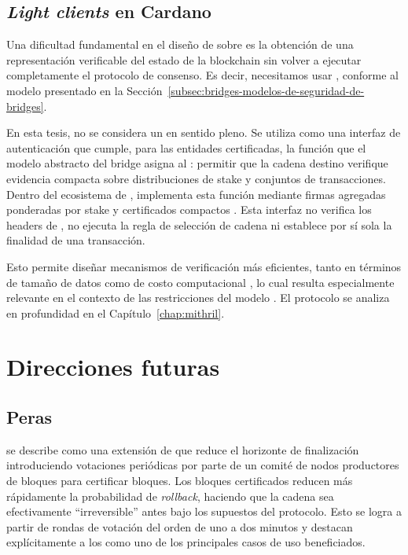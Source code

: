 \subsection{\textit{Light clients} en Cardano}
\label{subsec:motivation-light-clients-en-cardano}

Una dificultad fundamental en el diseño de \Bridges sobre \Cardano es la obtención de una representación verificable del estado de la blockchain sin volver a ejecutar completamente el protocolo de consenso. Es decir, necesitamos usar \LightClients, conforme al modelo presentado en la Sección~\ref{subsec:bridges-modelos-de-seguridad-de-bridges}.

En esta tesis, \Mithril no se considera un \LightClient en sentido pleno. Se utiliza como una interfaz de autenticación que cumple, para las entidades certificadas, la función que el modelo abstracto del bridge asigna al \LightClient: permitir que la cadena destino verifique evidencia compacta sobre distribuciones de stake y conjuntos de transacciones. Dentro del ecosistema de \Cardano, \Mithril implementa esta función mediante firmas agregadas ponderadas por stake y certificados compactos \cite{cryptoeprint:2021/916}. Esta interfaz no verifica los headers de \Praos, no ejecuta la regla de selección de cadena ni establece por sí sola la finalidad de una transacción.

Esto permite diseñar mecanismos de verificación más eficientes, tanto en términos de tamaño de datos como de costo computacional \Onchain, lo cual resulta especialmente relevante en el contexto de las restricciones del modelo \eUTxO. El protocolo \Mithril se analiza en profundidad en el Capítulo~\ref{chap:mithril}.

\section{Direcciones futuras}
\label{sec:motivation-direcciones-futuras}

\subsection{Peras}
\label{subsec:motivation-peras}

\Peras se describe como una extensión de \Praos que reduce el horizonte de finalización introduciendo votaciones periódicas por parte de un comité de nodos productores de bloques para certificar bloques. Los bloques certificados reducen más rápidamente la probabilidad de \textit{rollback}, haciendo que la cadena sea efectivamente ``irreversible'' antes bajo los supuestos del protocolo. Esto se logra a partir de rondas de votación del orden de uno a dos minutos y destacan explícitamente a los \Bridges como uno de los principales casos de uso beneficiados.

